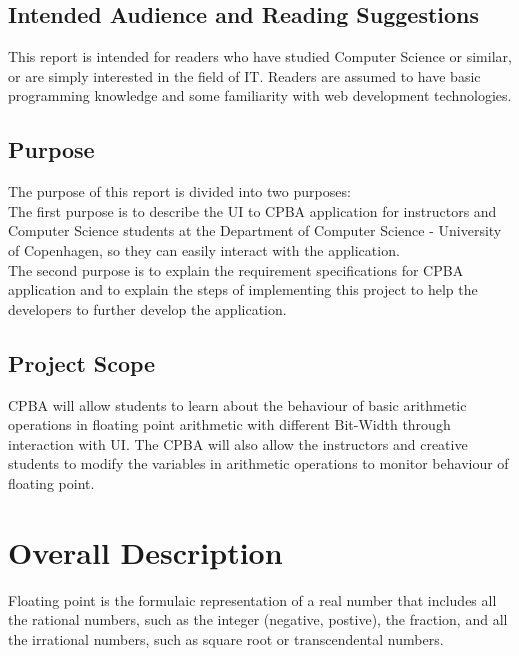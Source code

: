 \documentclass[11pt]{article}
\begin{document}
\subsection{Intended Audience and Reading Suggestions}
This report is intended for readers who have studied Computer Science or similar, or are simply interested in the field of IT. Readers are assumed to have basic programming knowledge and some familiarity with web development technologies.

\subsection{Purpose}
The purpose of this report is divided into two purposes:\\

The first purpose is to describe the UI to CPBA application for instructors and Computer Science students at the Department of Computer Science - University of Copenhagen, so they can easily interact with the application.\\

The second purpose is to explain the requirement specifications for CPBA application and to explain the steps of implementing this project to help the developers to further develop the application.

\subsection{Project Scope}
CPBA will allow students to learn about the behaviour of basic arithmetic operations in floating point arithmetic with different Bit-Width through interaction with UI. The CPBA will also allow the instructors and creative students to modify the variables in arithmetic operations to monitor behaviour of floating point.%

\section{Overall Description}\label{Overall Description}
Floating point is the formulaic representation of a real number that includes all the rational numbers, such as the integer (negative, postive), the fraction, and all the irrational numbers, such as square root or  transcendental numbers.\\
\end{document}
